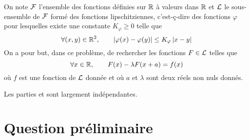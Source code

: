 \documentclass[a4paper,french,bookmarks]{article}
\begin{document}
    \renewcommand{\thesection}{\Roman{section}}
    \renewcommand{\thesection}{\Roman{section}}
    \renewcommand{\labelenumi}{\Roman{section}.\arabic{enumi}.}
    \renewcommand*{\labelenumii}{\Roman{section}.\arabic{enumi}.\arabic{enumii}.}
    \renewcommand*{\labelenumiii}{\alph{enumiii}.}

    
    On note $\mathcal{F}$ l'ensemble des fonctions définies sur $\mathbb{R}$ à valeurs dans $\mathbb{R}$ et $\mathcal{L}$ le sous-ensemble de $\mathcal{F}$ formé des fonctions lipschitziennes, c'est-ç-dire des fonctions $\varphi$ pour lesquelles existe une constante $K_\varphi \geq 0$ telle que
    \[ \forall \!\left(x, y\right) \in \mathbb{R}^2,\qquad \left\lvert\varphi\!\left(x\right) - \varphi\!\left(y\right)\right\rvert \leq K_\varphi\left\lvert x - y\right\rvert\]
    On a pour but, dans ce problème, de rechercher les fonctions $F \in \mathcal{L}$ telles que
    \begin{equation}
        \label{eq:eq1}\forall x \in \mathbb{R},\qquad F\!\left(x\right) - \lambda F\!\left(x + a\right) = f\!\left(x\right)
    \end{equation}
    où $f$ est une fonction de $\mathcal{L}$ donnée et où $a$ et $\lambda$ sont deux réels non nuls donnés.
    
    Les parties  et  sont largement indépendantes.
    
    \section{Question préliminaire}
    
\end{document}
